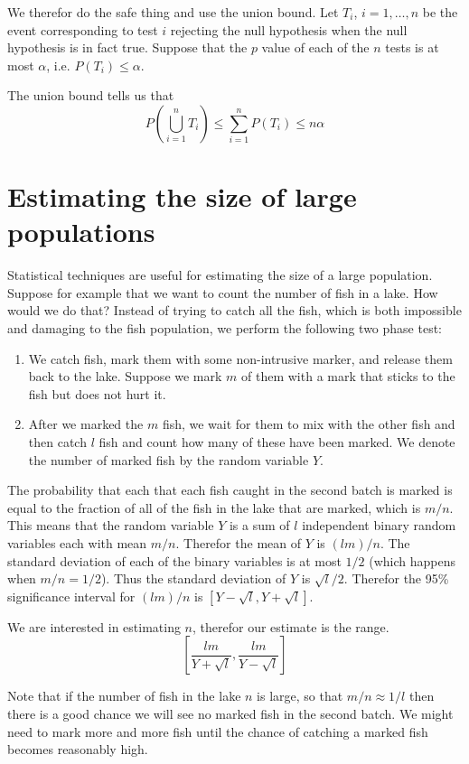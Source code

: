 We therefor do the safe thing and use the union bound. Let $T_i$,
$i=1,\ldots,n$ be the event corresponding to test $i$ rejecting the
null hypothesis when the null hypothesis is in fact true. Suppose that
the $p$ value of each of the $n$ tests is at most $\alpha$,
i.e. $P(T_i) \leq \alpha$.
 
The union bound tells us that 
\[
P\left( \bigcup_{i=1}^n T_i \right) \leq \sum_{i=1}^n P(T_i) \leq n \alpha
\]

\section{Estimating the size of large populations}
Statistical techniques are useful for estimating the size of a large
population. Suppose for example that we want to count the number of
fish in a lake. How would we do that? Instead of trying to catch all
the fish, which is both impossible and damaging to the fish
population, we perform the following two phase test:
\begin{enumerate}
\item We catch fish, mark them with some non-intrusive marker, and
  release them back to the lake. Suppose we mark $m$ of them with a
  mark that sticks to the fish but does not hurt it.
\item After we marked the $m$ fish, we wait for them to mix with the
  other fish and then catch $l$ fish and count how many of these
  have been marked. We denote the number of marked fish by the random
  variable $Y$.
\end{enumerate}
The probability that each that each fish caught in the second batch is
marked is equal to the fraction of all of the fish in the lake that
are marked, which is $m/n$. This means that the random variable $Y$ is
a sum of $l$ independent binary random variables each with mean $m/n$.
Therefor the mean of $Y$ is $(lm)/n$. The standard deviation of each
of the binary variables is at most $1/2$ (which happens when
$m/n=1/2$). Thus the standard deviation of $Y$ is $\sqrt{l}/2$.
Therefor the 95\% significance interval for $(lm)/n$ is
$[Y-\sqrt{l},Y+\sqrt{l}]$.

We are interested in estimating $n$, therefor our estimate is the range.
\[
\left[\frac{lm}{Y+\sqrt{l}}, \frac{lm}{Y-\sqrt{l}} \right]
\]

Note that if the number of fish in the lake $n$ is large, so that $m/n
\approx 1/l$ then there is a good chance we will see no marked fish in
the second batch. We might need to mark more and more fish until the
chance of catching a marked fish becomes reasonably high.

